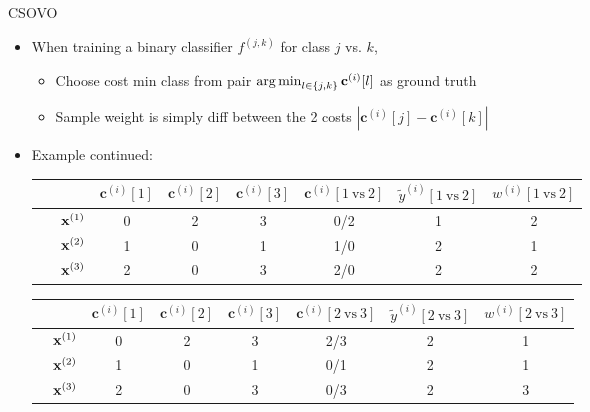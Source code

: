\documentclass[10pt,compress,t,notes=noshow, xcolor=table]{beamer}
\newcommand{\cv}{\mathbf{c}}
\begin{document}
\begin{frame}{CSOVO}
    \begin{itemize}
        \item When training a binary classifier $f^{(j, k)}$ for class $j$ vs. $k$,
        \begin{itemize}
            \item Choose cost min class from pair $\argmin_{l \in \{j, k\}} \cv^{(i)}[l]$ as ground truth 
            
            \item Sample weight is simply diff between the 2 costs      $|\cv^{(i)}[j] - \cv^{(i)}[k]|$

        \end{itemize}
        
        \item Example continued:
\begin{center}
    \footnotesize
                            \begin{tabular}{cc|ccc|ccc}\
        			& & $\cv^{(i)}[1]$ & $\cv^{(i)}[2]$ & $\cv^{(i)}[3]$ & $\cv^{(i)}[1 \ \text{vs} \ 2]$ & $\tilde{y}^{( i)}[1 \ \text{vs} \ 2]$ & $w^{(i)}[1 \ \text{vs} \ 2]$\\
        			\hline & $\mathbf{x}^{(1)}$ & 0 & 2 & 3 & 0/2 & 1 & 2\\
        			& $\mathbf{x}^{(2)}$ & 1 & 0 & 1 & 1/0 & 2 & 1 \\
                 	& $\mathbf{x}^{(3)}$ & 2 & 0 & 3 & 2/0 & 2 & 2\\
                \end{tabular}

                \begin{tabular}{cc|ccc|ccc}
        			& & $\cv^{(i)}[1]$ & $\cv^{(i)}[2]$ & $\cv^{(i)}[3]$ & $\cv^{(i)}[2 \ \text{vs} \ 3]$ & $\tilde{y}^{( i)}[2 \ \text{vs} \ 3]$ & $w^{(i)}[2 \ \text{vs} \ 3]$\\
        			\hline & $\mathbf{x}^{(1)}$ & 0 & 2 & 3 & 2/3 & 2 & 1\\
        			& $\mathbf{x}^{(2)}$ & 1 & 0 & 1 & 0/1 & 2 & 1\\
                 	& $\mathbf{x}^{(3)}$ & 2 & 0 & 3 & 0/3 & 2 & 3\\
                \end{tabular}
\end{center}

    \end{itemize}
\end{frame}
\end{document}
